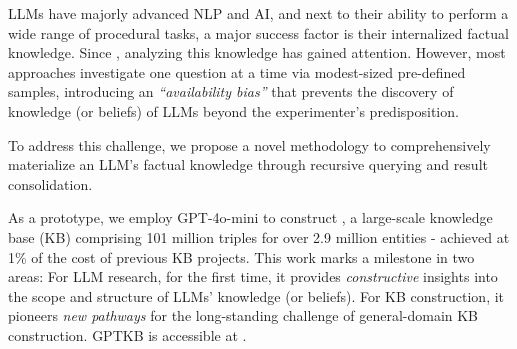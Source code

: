 LLMs have majorly advanced NLP and AI, and next to their ability to perform a wide range of procedural tasks, a major success factor is their internalized factual knowledge. Since \cite{petroni-etal-2019-language}, analyzing this knowledge has gained attention. However, most approaches investigate one question at a time via modest-sized pre-defined samples, introducing an \textit{``availability bias''} \cite{kahnemann} that prevents the discovery of knowledge (or beliefs) of LLMs beyond the experimenter's predisposition.

To address this challenge, we propose a novel methodology to comprehensively materialize an LLM's factual knowledge through recursive querying and result consolidation.

As a prototype, we employ GPT-4o-mini to construct \ourkb, a large-scale knowledge base (KB) comprising 101 million triples for over 2.9 million entities - achieved at 1\% of the cost of previous KB projects. This work marks a milestone in two areas: For LLM research, for the first time, it provides \textit{constructive} insights into the scope and structure of LLMs' knowledge (or beliefs). For KB construction, it pioneers \textit{new pathways} for the long-standing challenge of general-domain KB construction. GPTKB is accessible at \website.